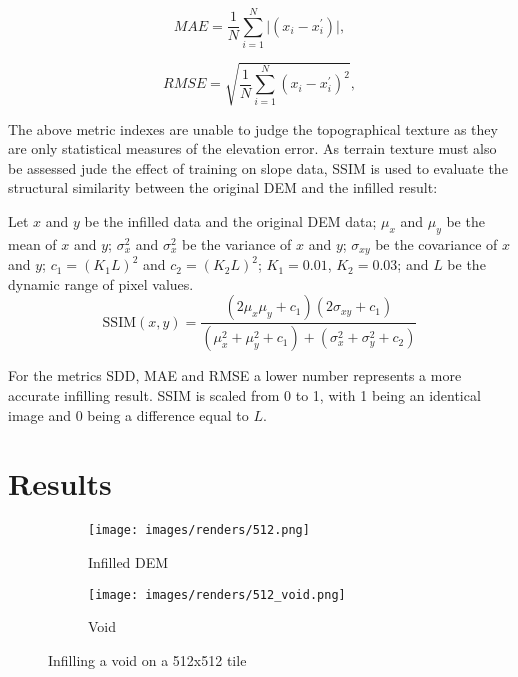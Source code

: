 \documentclass[twocolumn]{article}
\begin{document}
\begin{equation}
MAE = \frac{1}{N} \sum^N_{i=1} \vert(x_i - x^\prime_i )\vert,
\end{equation}

\begin{equation}
RMSE = \sqrt{\frac{1}{N} \sum^N_{i=1} (x_i - x^\prime_i)^2},
\end{equation}

The above metric indexes are unable to judge the topographical texture as they are only statistical measures of the elevation error.
As terrain texture must also be assessed jude the effect of training on slope data, SSIM is used to evaluate the structural similarity between the original DEM and the infilled result:

Let \(x\) and \(y\) be the infilled data and the original DEM data; \(\mu_x\) and \(\mu_y\) be the mean of \(x\) and \(y\); \(\sigma^2_x\) and \(\sigma^2_x\) be the variance of \(x\) and \(y\); \(\sigma_{xy}\) be the covariance of \(x\) and \(y\); \(c_1 = (K_1L)^2\) and \(c_2 = (K_2L)^2\); \(K_1 = 0.01\), \(K_2 = 0.03\); and \(L\) be the dynamic range of pixel values.
\begin{equation}
\text{SSIM}(x,y) = \frac{(2\mu_x\mu_y + c_1)(2 \sigma_{xy} + c_1)}{(\mu^2_x + \mu^2_y + c_1) + (\sigma_x^2 + \sigma^2_y + c_2)}
\end{equation}

For the metrics SDD, MAE and RMSE a lower number represents a more accurate infilling result.
SSIM is scaled from 0 to 1, with 1 being an identical image and 0 being a difference equal to \(L\).



\section{Results}
\label{sec:org0ab4669}

\begin{figure*}[p]
\begin{subfigure}{1\columnwidth}
  \caption{Infilled DEM}
  \texttt{[image: images/renders/512.png]}
  \label{fig:512}
\end{subfigure}
\hfill
\begin{subfigure}{1\columnwidth}
  \caption{Void}
  \texttt{[image: images/renders/512\_void.png]}
  \label{fig:512_void}
\end{subfigure}
\caption{Infilling a void on a 512x512 tile}
\label{fig:512_figure}
\end{figure*}
\end{document}
